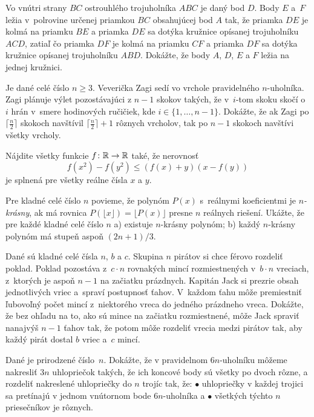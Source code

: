 {%
Vo vnútri strany $BC$ ostrouhlého trojuholníka $ABC$ je daný bod $D$. Body $E$ a~$F$ ležia v~polrovine určenej priamkou $BC$ obsahujúcej bod $A$ tak, že priamka $DE$ je kolmá na priamku $BE$ a priamka $DE$ sa dotýka kružnice opísanej trojuholníku $ACD$, zatiaľ čo priamka $DF$ je kolmá na priamku $CF$ a priamka $DF$ sa dotýka kružnice opísanej trojuholníku $ABD$. Dokážte, že body $A$, $D$, $E$ a $F$ ležia na jednej kružnici.}

{%
Je dané celé číslo $n\ge3$. Veverička Zagi sedí vo vrchole pravidelného $n$-uholníka. Zagi plánuje výlet pozostávajúci z $n-1$ skokov takých, že v~$i$-tom skoku skočí o~$i$ hrán v~smere hodinových ručičiek, kde $i\in \{1,\dots,n-1\}$. Dokážte, že ak Zagi po $\lceil{\frac n2}\rceil$ skokoch navštívil $\lceil{\frac n2}\rceil+1$ rôznych vrcholov, tak po $n-1$ skokoch navštívi všetky vrcholy.}

{%
Nájdite všetky funkcie $f\colon\Bbb R\to\Bbb R$ také, že nerovnosť
$$
f(x^2)-f(y^2)\le (f(x)+y)(x-f(y))
$$
je splnená pre všetky reálne čísla $x$ a $y$.
}

{%
Pre kladné celé číslo $n$ povieme, že polynóm $P(x)$ s~reálnymi koeficientmi je \emph{$n$-krásny}, ak má rovnica $P(\lfloor x \rfloor) = \lfloor P(x) \rfloor$ presne $n$ reálnych riešení. Ukážte, že pre každé kladné celé číslo $n$
\ite a) existuje $n$-krásny polynóm;
\ite b) každý $n$-krásny polynóm má stupeň aspoň $(2n+1)/3$.}

{%
Dané sú kladné celé čísla $n$, $b$ a $c$. Skupina $n$ pirátov si chce férovo rozdeliť poklad. Poklad pozostáva z~$c \cdot n$ rovnakých mincí rozmiestnených v~$b \cdot n$ vreciach, z~ktorých je aspoň $n-1$ na začiatku prázdnych. Kapitán Jack si prezrie obsah jednotlivých vriec a~spraví postupnosť ťahov. V~každom ťahu môže premiestniť ľubovoľný počet mincí z~niektorého vreca do jedného prázdneho vreca. Dokážte, že bez ohľadu na to, ako sú mince na začiatku rozmiestnené, môže Jack spraviť nanajvýš $n-1$ ťahov tak, že potom môže rozdeliť vrecia medzi pirátov tak, aby každý pirát dostal $b$ vriec a~$c$ mincí.}

{%
Dané je prirodzené číslo~$n$. Dokážte, že v pravidelnom $6n$-uholníku môžeme nakresliť $3n$ uhlopriečok takých, že ich koncové body sú všetky po dvoch rôzne, a rozdeliť nakreslené uhlopriečky do $n$ trojíc tak, že:
\ite $\bullet$ uhlopriečky v každej trojici sa pretínajú v jednom vnútornom bode $6n$-uholníka a
\ite $\bullet$ všetkých týchto $n$ priesečníkov je rôznych.\endgraf
}

